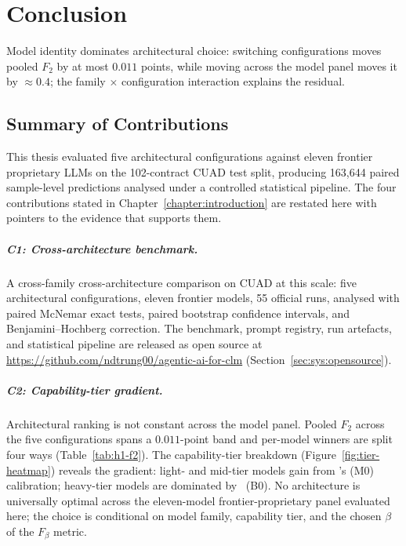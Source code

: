 
\chapter{Conclusion}\label{chapter:conclusion}

Model identity dominates architectural choice: switching configurations moves pooled $F_2$ by at most $0.011$ points, while moving across the model panel moves it by ${\approx}0.4$; the family $\times$ configuration interaction explains the residual.

\section{Summary of Contributions}\label{sec:concl:contributions}

This thesis evaluated five architectural configurations against eleven
frontier proprietary LLMs on the 102-contract CUAD test split, producing
163{,}644 paired sample-level predictions analysed under a controlled
statistical pipeline. The four contributions stated in
Chapter~\ref{chapter:introduction} are restated here with pointers to the
evidence that supports them.

\paragraph{C1: Cross-architecture benchmark.}
A cross-family cross-architecture comparison on CUAD at this scale:
five architectural configurations, eleven frontier models, 55 official runs,
analysed with paired McNemar exact tests, paired bootstrap confidence
intervals, and Benjamini--Hochberg correction. The benchmark, prompt
registry, run artefacts, and statistical pipeline are released as
open source at \url{https://github.com/ndtrung00/agentic-ai-for-clm}
(Section~\ref{sec:sys:opensource}).

\paragraph{C2: Capability-tier gradient.}
Architectural ranking is not constant across the model panel. Pooled $F_2$
across the five configurations spans a $0.011$-point band and per-model
winners are split four ways (Table~\ref{tab:h1-f2}). The capability-tier
breakdown (Figure~\ref{fig:tier-heatmap}) reveals the gradient: light- and
mid-tier models gain from \cfgCX's (M0) calibration; heavy-tier models are
dominated by \cfgZS\ (B0). No architecture is universally optimal across the eleven-model
frontier-proprietary panel evaluated here; the choice is conditional on
model family, capability tier, and the chosen $\beta$ of the $F_\beta$
metric.

